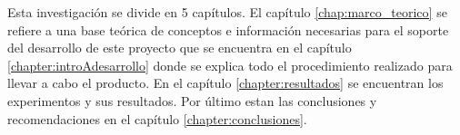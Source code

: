 


Esta investigaci\'on se divide en 5 cap\'itulos. El cap\'itulo \ref{chap:marco_teorico} se refiere a una base te\'orica de conceptos e informaci\'on necesarias para el soporte del desarrollo de este proyecto que se encuentra en el cap\'itulo  \ref{chapter:introAdesarrollo} donde se explica todo el procedimiento realizado para llevar a cabo el producto. En el cap\'itulo \ref{chapter:resultados} se encuentran  los experimentos y sus resultados. Por \'ultimo estan las conclusiones y recomendaciones en el capítulo \ref{chapter:conclusiones}. 
